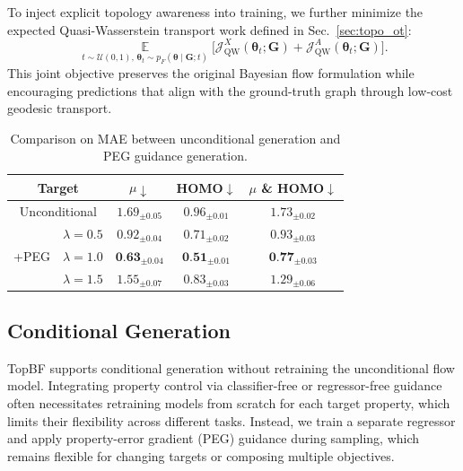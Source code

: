 \documentclass[journal,twoside,web]{ieeecolor}
\begin{document}
To inject explicit topology awareness into training, we further minimize the expected Quasi-Wasserstein transport work defined in Sec.~\ref{sec:topo_ot}: 
\begin{equation}
\mathop{\mathbb{E}}\limits_{t\sim\mathcal{U}(0,1),\,\boldsymbol{\theta}_t\sim p_F(\boldsymbol{\theta}\mid \mathbf{G};t)}
\Big[
\mathcal{J}^{X}_{\mathrm{QW}}(\boldsymbol{\theta}_t; \mathbf{G})
+
\mathcal{J}^{A}_{\mathrm{QW}}(\boldsymbol{\theta}_t; \mathbf{G})
\Big].
\label{eq:total_topo_objective}
\end{equation}
This joint objective preserves the original Bayesian flow formulation while encouraging predictions that align with the ground-truth graph through low-cost geodesic transport.


\begin{table}
  \centering
  \caption{Comparison on MAE between unconditional generation and PEG guidance generation.}
  \renewcommand \arraystretch{1.}
  \begin{tabular*}{\columnwidth}{@{\extracolsep{\fill}}ccccc@{\extracolsep{\fill}}}
    \hline

    \multicolumn{2}{c}{Target} & $\mu\downarrow$ & HOMO$\downarrow$ & $\mu$ \& HOMO$\downarrow$ \\
    \hline
    \multicolumn{2}{c}{Unconditional} & $\text{1.69}_{\pm\text{0.05}}$ & $\text{0.96}_{\pm\text{0.01}}$ & $\text{1.73}_{\pm\text{0.02}}$ \\
    \hline
    \multirow{3}{*}{+PEG} & $\lambda=0.5$ & $\text{0.92}_{\pm\text{0.04}}$ & $\text{0.71}_{\pm\text{0.02}}$ & $\text{0.93}_{\pm\text{0.03}}$ \\
     & $\lambda=1.0$ & $\textbf{0.63}_{\pm\text{0.04}}$ & $\textbf{0.51}_{\pm\text{0.01}}$ & $\textbf{0.77}_{\pm\text{0.03}}$ \\
     & $\lambda=1.5$ & $\text{1.55}_{\pm\text{0.07}}$ & $\text{0.83}_{\pm\text{0.03}}$ & $\text{1.29}_{\pm\text{0.06}}$ \\
    \hline
  \end{tabular*}
  \label{tab:qm9-conditional}
\end{table}

\subsection{Conditional Generation}

TopBF supports conditional generation without retraining the unconditional flow model. Integrating property control via classifier-free \cite{ho2021classifier} or regressor-free \cite{li2024regressor} guidance often necessitates retraining models from scratch for each target property, which limits their flexibility across different tasks. Instead, we train a separate regressor and apply property-error gradient (PEG) guidance during sampling, which remains flexible for changing targets or composing multiple objectives.
\end{document}
